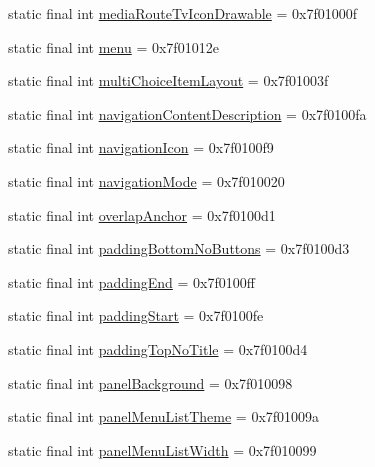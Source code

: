 \begin{CompactItemize}
static final int \hyperlink{classandroid_1_1support_1_1coreutils_1_1_r_1_1attr_50c13111d33a0a4f5e7bcbc6c296fe90}{mediaRouteTvIconDrawable} = 0x7f01000f
\item 
static final int \hyperlink{classandroid_1_1support_1_1coreutils_1_1_r_1_1attr_aad1ce928da7b332ccdc4d185fdebf9f}{menu} = 0x7f01012e
\item 
static final int \hyperlink{classandroid_1_1support_1_1coreutils_1_1_r_1_1attr_ddf19eb488da420a96031e2b56589e73}{multiChoiceItemLayout} = 0x7f01003f
\item 
static final int \hyperlink{classandroid_1_1support_1_1coreutils_1_1_r_1_1attr_e5c595e09fc4228a0c1e8299cf989d32}{navigationContentDescription} = 0x7f0100fa
\item 
static final int \hyperlink{classandroid_1_1support_1_1coreutils_1_1_r_1_1attr_bdc43dff8f6bc804d2b7386274906a95}{navigationIcon} = 0x7f0100f9
\item 
static final int \hyperlink{classandroid_1_1support_1_1coreutils_1_1_r_1_1attr_cc0dd19990ecb8157fba94355c4060fc}{navigationMode} = 0x7f010020
\item 
static final int \hyperlink{classandroid_1_1support_1_1coreutils_1_1_r_1_1attr_2782b1c03cbdbb0297a67cf4440dc258}{overlapAnchor} = 0x7f0100d1
\item 
static final int \hyperlink{classandroid_1_1support_1_1coreutils_1_1_r_1_1attr_447e91e4544febfac183abdfbb3c68a4}{paddingBottomNoButtons} = 0x7f0100d3
\item 
static final int \hyperlink{classandroid_1_1support_1_1coreutils_1_1_r_1_1attr_810238a672cfa60a77a448ddaef32569}{paddingEnd} = 0x7f0100ff
\item 
static final int \hyperlink{classandroid_1_1support_1_1coreutils_1_1_r_1_1attr_25bfdd5b2d98d98bcaf08875235aac79}{paddingStart} = 0x7f0100fe
\item 
static final int \hyperlink{classandroid_1_1support_1_1coreutils_1_1_r_1_1attr_3375022ce81402ef6749bed7eb6dcd05}{paddingTopNoTitle} = 0x7f0100d4
\item 
static final int \hyperlink{classandroid_1_1support_1_1coreutils_1_1_r_1_1attr_c9960b05ab4002f588d5b927e498ce59}{panelBackground} = 0x7f010098
\item 
static final int \hyperlink{classandroid_1_1support_1_1coreutils_1_1_r_1_1attr_6568208926de9029f7926018b85c62db}{panelMenuListTheme} = 0x7f01009a
\item 
static final int \hyperlink{classandroid_1_1support_1_1coreutils_1_1_r_1_1attr_e9ebd4e7c1039a9a64b8fe6b950319cd}{panelMenuListWidth} = 0x7f010099

\end{CompactItemize}
